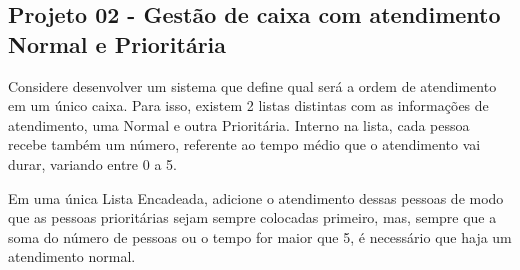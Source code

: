 \documentclass[a4paper]{exam}
\begin{document}
\newpage
\begin{center}
	\section*{Projeto 02 - Gestão de caixa com atendimento Normal e Prioritária}
\end{center}

Considere desenvolver um sistema que define qual será a ordem de atendimento em um único caixa. Para isso, existem 2 listas distintas com as informações de atendimento, uma Normal e outra Prioritária. Interno na lista, cada pessoa recebe também um número, referente ao tempo médio que o atendimento vai durar, variando entre 0 a 5.

Em uma única Lista Encadeada, adicione o atendimento dessas pessoas de modo que as pessoas prioritárias sejam sempre colocadas primeiro, mas, sempre que a soma do número de pessoas ou o tempo for maior que 5, é necessário que haja um atendimento normal.
\end{document}
